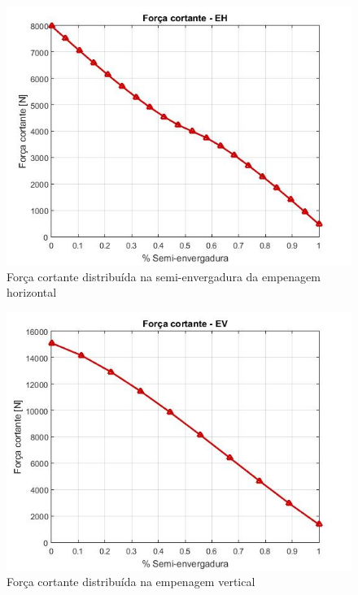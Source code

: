 \begin{figure}
\centering
\includegraphics[width=\textwidth]{cargas/imagens/cort_EH.JPG}
\caption{Força cortante distribuída na semi-envergadura da empenagem horizontal}
\label{fig:cort_EH}
\end{figure}

\begin{figure}
\centering
\includegraphics[width=\textwidth]{cargas/imagens/cort_EV.JPG}
\caption{Força cortante distribuída na empenagem vertical}
\label{fig:cort_EV}
\end{figure}

